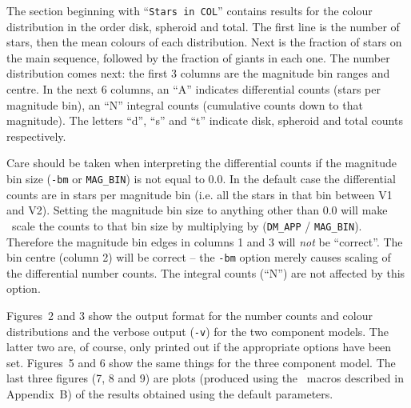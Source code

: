 The section  beginning with ``{\tt Stars in COL}''  contains results  for  
the colour distribution in  the
order disk, spheroid  and total. The first line  is the number of stars,
then  the mean colours  of each distribution. Next  is the  fraction  of
stars on the main  sequence,  followed by  the fraction of giants  in
each one.  The number distribution  comes next: the  first 3 columns are
the magnitude  bin  ranges  and centre. In  the  next 6  columns, an ``A''
indicates  differential  counts (stars per magnitude bin), an ``N'' integral 
counts (cumulative counts down to that magnitude). The letters ``d'', ``s'' 
and ``t'' indicate  disk, spheroid and total counts respectively. 

Care should be taken when interpreting the
differential counts if the magnitude bin size ({\tt -bm} or 
{\tt MAG\_BIN}) is not equal to 0.0. In the default case 
the differential counts are in stars per magnitude bin (i.e. all the stars in
that bin between V1 and V2). Setting the magnitude
bin size to anything other than 0.0 will make \egm\ scale the counts to that
bin size by multiplying by ({\tt DM\_APP} / {\tt MAG\_BIN}).
Therefore the magnitude bin edges in columns 1 and 
3 will {\em not} be ``correct''. The bin centre (column 2) will be 
correct -- the {\tt -bm} option merely causes scaling of the differential 
number counts. The integral counts (``N'') are not affected by this option.

Figures~2 and 3 show the output format for the number counts and colour 
distributions and the verbose output ({\tt -v}) for the two component models. 
The latter two are, of course, only printed out if the appropriate options 
have been set. Figures~5 and 6 show the same things for the three component 
model. The last three figures (7, 8 and 9) are plots (produced using the \sm\ 
macros described in Appendix~B) of the results obtained using the default 
parameters.

